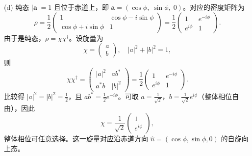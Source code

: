 \begin{solution}
(d) 纯态 $|\mathbf a|=1$ 且位于赤道上，即 $\mathbf a = (\cos\phi,\;\sin\phi,\;0)$。对应的密度矩阵为
\[
\rho = \frac12\begin{pmatrix}
1 & \cos\phi - i\sin\phi\\
\cos\phi + i\sin\phi & 1
\end{pmatrix}
= \frac12\begin{pmatrix}
1 & e^{-i\phi}\\
e^{i\phi} & 1
\end{pmatrix}.
\]
由于是纯态，$\rho = \chi\chi^\dagger$。设旋量为
\[
\chi = \begin{pmatrix}a\\b\end{pmatrix},\quad |a|^2+|b|^2=1,
\]
则
\[
\chi\chi^\dagger = \begin{pmatrix}|a|^2 & ab^*\\ a^*b & |b|^2\end{pmatrix}
= \frac12\begin{pmatrix}1 & e^{-i\phi}\\ e^{i\phi} & 1\end{pmatrix}.
\]
比较得 $|a|^2 = |b|^2 = \frac12$，且 $ab^* = \frac12 e^{-i\phi}$。可取 $a = \frac{1}{\sqrt{2}}$，$b = \frac{1}{\sqrt{2}}e^{i\phi}$（整体相位自由），因此
\[
\boxed{\chi = \frac{1}{\sqrt{2}}\begin{pmatrix}1\\ e^{i\phi}\end{pmatrix},}
\]
整体相位可任意选择。这一旋量对应沿赤道方向 $\hat n = (\cos\phi,\sin\phi,0)$ 的自旋向上态。
\end{solution}
